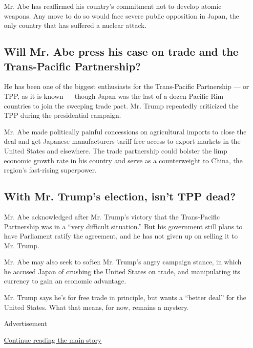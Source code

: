 Mr. Abe has reaffirmed his country's commitment not to develop atomic
weapons. Any move to do so would face severe public opposition in Japan,
the only country that has suffered a nuclear attack.

\hypertarget{will-mr-abe-press-his-case-on-trade-and-the-trans-pacific-partnership}{%
\subsection{Will Mr. Abe press his case on trade and the Trans-Pacific
Partnership?}\label{will-mr-abe-press-his-case-on-trade-and-the-trans-pacific-partnership}}

He has been one of the biggest enthusiasts for the Trans-Pacific
Partnership --- or TPP, as it is known --- though Japan was the last of
a dozen Pacific Rim countries to join the sweeping trade pact. Mr. Trump
repeatedly criticized the TPP during the presidential campaign.

Mr. Abe made politically painful concessions on agricultural imports to
close the deal and get Japanese manufacturers tariff-free access to
export markets in the United States and elsewhere. The trade partnership
could bolster the limp economic growth rate in his country and serve as
a counterweight to China, the region's fast-rising superpower.

\hypertarget{with-mr-trumps-election-isnt-tpp-dead}{%
\subsection{With Mr. Trump's election, isn't TPP
dead?}\label{with-mr-trumps-election-isnt-tpp-dead}}

Mr. Abe acknowledged after Mr. Trump's victory that the Trans-Pacific
Partnership was in a ``very difficult situation.'' But his government
still plans to have Parliament ratify the agreement, and he has not
given up on selling it to Mr. Trump.

Mr. Abe may also seek to soften Mr. Trump's angry campaign stance, in
which he accused Japan of crushing the United States on trade, and
manipulating its currency to gain an economic advantage.

Mr. Trump says he's for free trade in principle, but wants a ``better
deal'' for the United States. What that means, for now, remains a
mystery.

Advertisement

\protect\hyperlink{after-bottom}{Continue reading the main story}

